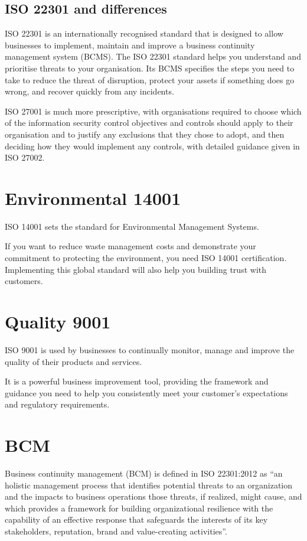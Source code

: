 \documentclass[a4paper,12pt]{article}
\begin{document}
\subsection{ISO 22301 and differences}

ISO 22301 is an internationally recognised standard that is designed to allow businesses to implement, maintain and improve a business continuity management system (BCMS). The ISO 22301 standard helps you understand and prioritise threats to your organisation. Its BCMS specifies the steps you need to take to reduce the threat of disruption, protect your assets if something does go wrong, and recover quickly from any incidents.

ISO 27001 is much more prescriptive, with organisations required to choose which of the
information security control objectives and controls should apply to their organisation and to justify
any exclusions that they chose to adopt, and then deciding how they would implement any controls,
with detailed guidance given in ISO 27002.


\section{Environmental 14001}
ISO 14001 sets the standard for Environmental Management Systems.

If you want to reduce waste management costs and demonstrate your commitment to protecting the environment, you need ISO 14001 certification. Implementing this global standard will also help you building trust with customers.

\section{Quality 9001}
ISO 9001 is used by businesses to continually monitor, manage and improve the quality of their products and services.

It is a powerful business improvement tool, providing the framework and guidance you need to help you consistently meet your customer’s expectations and regulatory requirements.

\clearpage

\printindex

\section{BCM}
Business continuity management (BCM) is defined in ISO 22301:2012 as “an holistic management process that identifies potential threats to an organization and the impacts to business operations those threats, if realized, might cause, and which provides a framework for building organizational resilience with the capability of an effective response that safeguards the interests of its key stakeholders, reputation, brand and value-creating activities”.
\end{document}
